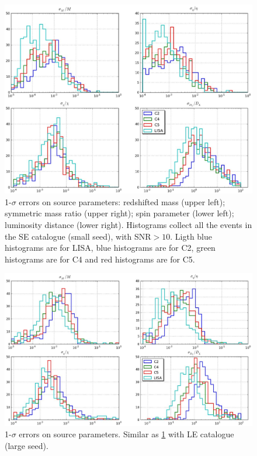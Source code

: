 \documentclass{iopart}
\begin{document}
\begin{figure}[H]
\center
   \includegraphics[width=1\textwidth]{FigSMBHPhenomAEI/Hist_SE_LISAC2C4C5.eps}
\caption{1-$\sigma$ errors on source parameters: redshifted mass (upper left); symmetric mass ratio (upper right); spin parameter (lower left); luminosity distance (lower right). Histograms collect all the events in the SE catalogue (small seed), with SNR$>10$. Ligth blue histograms are for LISA, blue histograms are for C2, green histograms are for C4 and red histograms are for C5.
\label{Hist_SE_LISAC2C4C5} } 
\end{figure}

\begin{figure}[H]
\center
   \includegraphics[width=1\textwidth]{FigSMBHPhenomAEI/Hist_LE_LISAC2C4C5.eps}
\caption{1-$\sigma$ errors on source parameters. Similar as \ref{Hist_SE_LISAC2C4C5} with LE catalogue (large seed).
\label{Hist_LE_LISAC2C4C5} } 
\end{figure}
\end{document}
